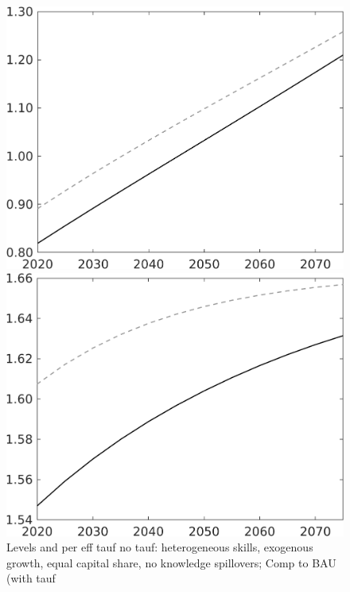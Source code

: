 \documentclass[12pt]{article}
\begin{document}
\begin{figure}
	\centering
\caption{Levels and per eff tauf no tauf: heterogeneous skills, exogenous growth, equal capital share, no knowledge spillovers; Comp to BAU (with tauf}\label{fig:Leveltauf_nsk0_xgr1_equalcapShare_noknow_withtaul2}

\begin{minipage}[]{0.32\textwidth}
	\includegraphics[width=1\textwidth]{../../codding_model/own_basedOnFried/optimalPol_010922_revision/figures/all_13Sept22/LevTaufNoTauf_TaulCalib_Equlab_regime0_N_spillover0_nsk0_xgr1_knspil1_sep1_LFlimit0_emsbase0_countec0_GovRev0_etaa0.79_lgd0.png}
\end{minipage}		
\begin{minipage}[]{0.32\textwidth}
	\includegraphics[width=1\textwidth]{../../codding_model/own_basedOnFried/optimalPol_010922_revision/figures/all_13Sept22/LevTaufNoTauf_TaulCalib_Equlab_regime0_pn_spillover0_nsk0_xgr1_knspil1_sep1_LFlimit0_emsbase0_countec0_GovRev0_etaa0.79_lgd0.png}

\end{minipage}
\end{figure}
\end{document}
